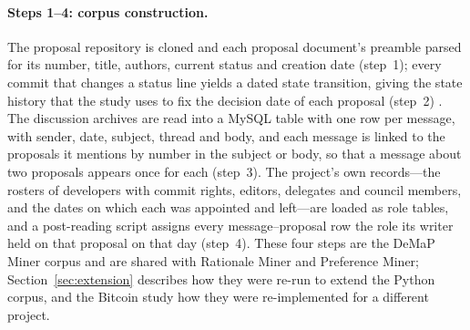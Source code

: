 \paragraph{Steps 1--4: corpus construction.} The proposal repository is cloned and each proposal document's preamble parsed for its number, title, authors, current status and creation date (step~1); every commit that changes a status line yields a dated state transition, giving the state history that the study uses to fix the decision date of each proposal (step~2) \cite{sharma2022demap}. The discussion archives are read into a MySQL table with one row per message, with sender, date, subject, thread and body, and each message is linked to the proposals it mentions by number in the subject or body, so that a message about two proposals appears once for each (step~3). The project's own records---the rosters of developers with commit rights, editors, delegates and council members, and the dates on which each was appointed and left---are loaded as role tables, and a post-reading script assigns every message--proposal row the role its writer held on that proposal on that day (step~4). These four steps are the DeMaP Miner corpus and are shared with Rationale Miner and Preference Miner; Section~\ref{sec:extension} describes how they were re-run to extend the Python corpus, and the Bitcoin study \cite{influenceMinerBitcoin} how they were re-implemented for a different project.

